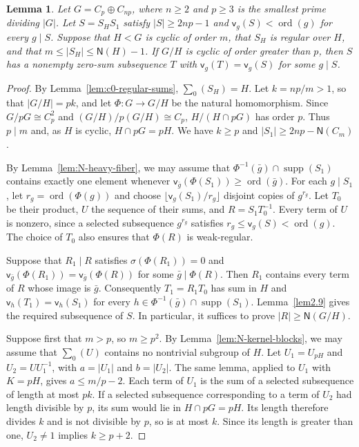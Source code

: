 \documentclass[10pt,a4paper]{amsart}
\newtheorem{lem}[thm]{Lemma}
\theoremstyle{definition}
\theoremstyle{remark}
\numberwithin{equation}{section}
\DeclareMathOperator{\ord}{ord}
\DeclareMathOperator{\supp}{supp}
\begin{document}
\begin{lem}\label{lem:N-cyclic-quotient}
Let $G=C_p\oplus C_{np}$, where $n\ge2$ and $p\ge3$ is the
smallest prime dividing $|G|$.
Let $S=S_HS_1$ satisfy $|S|\ge2np-1$ and
$\mathsf v_g(S)<\ord(g)$ for every $g\mid S$.
Suppose that $H<G$ is cyclic of order $m$, that $S_H$ is regular over $H$,
and that $m\le|S_H|\le\mathsf N(H)-1$.
If $G/H$ is cyclic of order greater than $p$, then $S$ has a nonempty
zero-sum subsequence $T$ with $\mathsf v_g(T)=\mathsf v_g(S)$
for some $g\mid S$.
\end{lem}
\begin{proof}
By Lemma~\ref{lem:c0-regular-sums}, $\sum_0(S_H)=H$.
Let $k=np/m>1$, so that $|G/H|=pk$, and let $\Phi:G\to G/H$
be the natural homomorphism.
Since $G/pG\cong C_p^2$ and $(G/H)/p(G/H)\cong C_p$,
$H/(H\cap pG)$ has order $p$. Thus $p\mid m$ and,
as $H$ is cyclic, $H\cap pG=pH$.
We have $k\ge p$ and $|S_1|\ge2np-\mathsf N(C_m)$.

By Lemma~\ref{lem:N-heavy-fiber}, we may assume that
$\Phi^{-1}(\bar g)\cap\supp(S_1)$ contains exactly one element whenever
$\mathsf v_{\bar g}(\Phi(S_1))\ge\ord(\bar g)$.
For each $g\mid S_1$, let $r_g=\ord(\Phi(g))$ and choose
$\lfloor\mathsf v_g(S_1)/r_g\rfloor$ disjoint copies of $g^{r_g}$.
Let $T_0$ be their product, $U$ the sequence of their sums, and
$R=S_1T_0^{-1}$.
Every term of $U$ is nonzero, since a selected subsequence $g^{r_g}$
satisfies $r_g\le\mathsf v_g(S)<\ord(g)$.
The choice of $T_0$ also ensures that $\Phi(R)$ is weak-regular.

Suppose that $R_1\mid R$ satisfies $\sigma(\Phi(R_1))=0$ and
$\mathsf v_{\bar g}(\Phi(R_1))=\mathsf v_{\bar g}(\Phi(R))$
for some $\bar g\mid\Phi(R)$.
Then $R_1$ contains every term of $R$ whose image is $\bar g$.
Consequently $T_1=R_1T_0$ has sum in $H$ and
$\mathsf v_h(T_1)=\mathsf v_h(S_1)$ for every
$h\in\Phi^{-1}(\bar g)\cap\supp(S_1)$.
Lemma~\ref{lem2.9} gives the required subsequence of $S$.
In particular, it suffices to prove $|R|\ge\mathsf N(G/H)$.

Suppose first that $m>p$, so $m\ge p^2$.
By Lemma~\ref{lem:N-kernel-blocks}, we may assume that $\sum_0(U)$
contains no nontrivial subgroup of $H$.
Let $U_1=U_{pH}$ and $U_2=UU_1^{-1}$, with $a=|U_1|$ and $b=|U_2|$.
The same lemma, applied to $U_1$ with $K=pH$, gives $a\le m/p-2$.
Each term of $U_1$ is the sum of a selected subsequence of length at most $pk$.
If a selected subsequence corresponding to a term of $U_2$ had length
divisible by $p$, its sum would lie in $H\cap pG=pH$.
Its length therefore divides $k$ and is not divisible by $p$, so is at most $k$.
Since its length is greater than one, $U_2\ne1$ implies $k\ge p+2$.


\end{proof}
\end{document}
